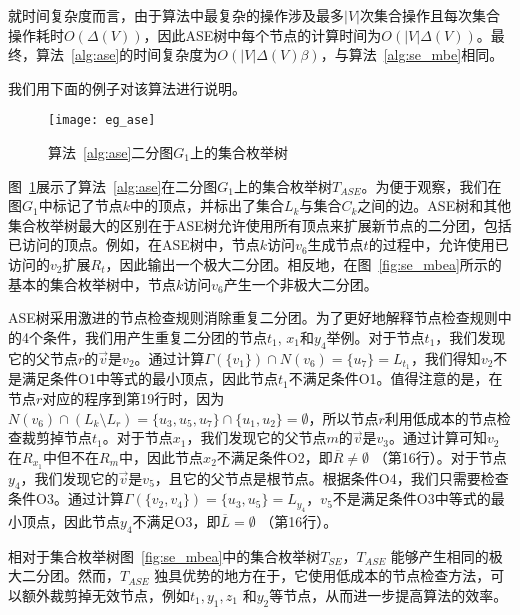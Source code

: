 就时间复杂度而言，由于算法中最复杂的操作涉及最多$|V|$次集合操作且每次集合操作耗时$O(\Delta(V))$，因此ASE树中每个节点的计算时间为$O(|V|\Delta(V))$。最终，算法~\ref{alg:ase}的时间复杂度为$O(|V|\Delta(V)\beta)$，与算法~\ref{alg:se_mbe}相同。

我们用下面的例子对该算法进行说明。

\begin{figure} [ht]
  \vspace{0.1 in}
  \centering
  \texttt{[image: eg\_ase]}
  \vspace{0.1 in}
  \caption{算法~\ref{alg:ase}二分图$G_1$上的集合枚举树}
  \label{fig:ase}
\end{figure}

\begin{example}
  \label{example:ase}
  图~\ref{fig:ase}展示了算法~\ref{alg:ase}在二分图$G_1$上的集合枚举树$T_{ASE}$。为便于观察，我们在图$G_1$中标记了节点$k$中的顶点，并标出了集合$L_k$与集合$C_k$之间的边。ASE树和其他集合枚举树最大的区别在于ASE树允许使用所有顶点来扩展新节点的二分团，包括已访问的顶点。例如，在ASE树中，节点$k$访问$v_6$生成节点$t$的过程中，允许使用已访问的$v_2$扩展$R_t$，因此输出一个极大二分团。相反地，在图~\ref{fig:se_mbea}所示的基本的集合枚举树中，节点$k$访问$v_6$产生一个非极大二分团。

  ASE树采用激进的节点检查规则消除重复二分团。为了更好地解释节点检查规则中的4个条件，我们用产生重复二分团的节点$t_1$, $x_1$和$y_4$举例。对于节点$t_1$，我们发现它的父节点$r$的$\vec{v}$是$v_2$。通过计算$\Gamma(\{v_1\})\cap N(v_6)=\{u_7\} = L_{t_1}$，我们得知$v_2$不是满足条件O1中等式的最小顶点，因此节点$t_1$不满足条件O1。值得注意的是，在节点$r$对应的程序到第19行时，因为$N(v_6) \cap (L_k \setminus L_r) = \{u_3, u_5, u_7\} \cap \{u_1, u_2\} = \emptyset$，所以节点$r$利用低成本的节点检查裁剪掉节点$t_1$。对于节点$x_1$，我们发现它的父节点$m$的$\vec{v}$是$v_3$。通过计算可知$v_2$在$R_{x_1}$中但不在$R_{m}$中，因此节点$x_2$不满足条件O2，即$\overline{R}\neq\emptyset$ （第16行）。对于节点$y_4$，我们发现它的$\vec{v}$是$v_5$，且它的父节点是根节点。根据条件O4，我们只需要检查条件O3。通过计算$\Gamma(\{v_2, v_4\}) = \{u_3, u_5\} = L_{y_4}$，$v_5$不是满足条件O3中等式的最小顶点，因此节点$y_4$不满足O3，即$\overline{L}=\emptyset$ （第16行）。
  
  相对于集合枚举树图~\ref{fig:se_mbea}中的集合枚举树$T_{SE}$，$T_{ASE}$ 能够产生相同的极大二分团。然而，$T_{ASE}$ 独具优势的地方在于，它使用低成本的节点检查方法，可以额外裁剪掉无效节点，例如$t_1, y_1, z_1$ 和$y_2$等节点，从而进一步提高算法的效率。

\end{example}

